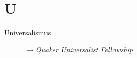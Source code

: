 \section*{U}

\articlesize

\begin{description}
 \item[Universalismus] $\to$\textit{Quaker Universalist Fellowship}
 \end{description}
\normalsize

